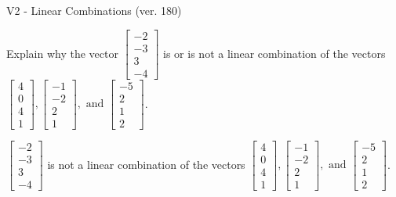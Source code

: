\begin{exercise}
  \begin{exerciseTitle}V2 - Linear Combinations (ver. 180)\end{exerciseTitle}
  \begin{exerciseStatement}
    Explain why the vector \(\left[\begin{array}{c}
-2 \\
-3 \\
3 \\
-4
\end{array}\right]\)  is or is not a linear 
	combination of the vectors \(\left[\begin{array}{c}
4 \\
0 \\
4 \\
1
\end{array}\right] , \left[\begin{array}{c}
-1 \\
-2 \\
2 \\
1
\end{array}\right] , \text{ and } \left[\begin{array}{c}
-5 \\
2 \\
1 \\
2
\end{array}\right]\).
	


  \end{exerciseStatement}
  \begin{exerciseAnswer}
   \(\left[\begin{array}{c}
-2 \\
-3 \\
3 \\
-4
\end{array}\right]\) 
  	 is not  
	a linear combination of the vectors \(\left[\begin{array}{c}
4 \\
0 \\
4 \\
1
\end{array}\right] , \left[\begin{array}{c}
-1 \\
-2 \\
2 \\
1
\end{array}\right] , \text{ and } \left[\begin{array}{c}
-5 \\
2 \\
1 \\
2
\end{array}\right]\).

	
  


  \end{exerciseAnswer}
\end{exercise}